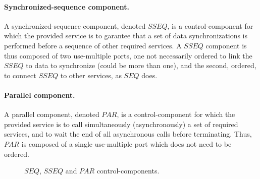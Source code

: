 \paragraph{Synchronized-sequence component.} A synchronized-sequence component, denoted $SSEQ$, is a control-component for which the provided service is to garantee that a set of data synchronizations is performed before a sequence of other required services. A $SSEQ$ component is thus composed of two use-multiple ports, one not necessarily ordered to link the $SSEQ$ to data to synchronize (could be more than one), and the second, ordered, to connect $SSEQ$ to other services, as $SEQ$ does.

\paragraph{Parallel component.} A parallel component, denoted $PAR$, is a control-component for which the provided service is to call simultaneously (asynchronously) a set of required services, and to wait the end of all asynchronous calls before terminating. Thus, $PAR$ is composed of a single use-multiple port which does not need to be ordered.

\begin{figure}[h!]
\captionsetup[subfigure]{labelformat=empty}
\begin{center}
\hspace{50pt}
\hspace{50pt}
\caption{$SEQ$, $SSEQ$ and $PAR$ control-components.}
\label{fig:control}
\end{center}
\end{figure}

